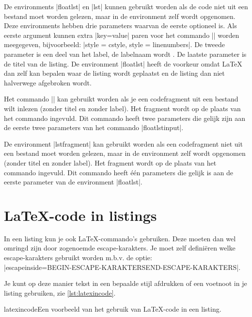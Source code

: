 De environments |floatlst| en |lst| kunnen gebruikt worden als de code niet uit een bestand moet worden gelezen, maar in de environment zelf wordt opgenomen.
Deze environments hebben drie parameters waarvan de eerste optioneel is.
Als eerste argument kunnen extra |key=value| paren voor het commando |\lstset| worden meegegeven, bijvoorbeeld: |style = cstyle, style = linenumbers|.
De tweede parameter is een deel van het label, de labelnaam wordt {\lstllabel{}}.
De laatste parameter is de titel van de listing.
De environment |floatlst| heeft de voorkeur omdat \LaTeX{} dan zelf kan bepalen waar de listing wordt geplaatst en de listing dan niet halverwege afgebroken wordt.

Het commando |\lstinputfragment| kan gebruikt worden als je een codefragment uit een bestand wilt inlezen (zonder titel en zonder label).
Het fragment wordt op de plaats van het commando ingevuld.
Dit commando heeft twee parameters die gelijk zijn aan de eerste twee parameters van het commando |floatlstinput|.

De environment |lstfragment| kan gebruikt worden als een codefragment niet uit een bestand moet worden gelezen, maar in de environment zelf wordt opgenomen (zonder titel en zonder label).
Het fragment wordt op de plaats van het commando ingevuld.
Dit commando heeft één parameters die gelijk is aan de eerste parameter van de environment |floatlst|.

\section{\LaTeX-code in listings}
In een listing kun je ook \LaTeX-commando's gebruiken. Deze moeten dan wel omringd zijn door zogenoemde escape-karakters. Je moet zelf definiëren welke escape-karakters gebruikt worden m.b.v. de optie:\\ |escapeinside={BEGIN-ESCAPE-KARAKTERS}{END-ESCAPE-KARAKTERS}|.

Je kunt op deze manier tekst in een bepaalde stijl afdrukken of een voetnoot in je listing gebruiken, zie \cref{lst:latexincode}. 
\begin{lst}[style=lstyle]{latexincode}{Een voorbeeld van het gebruik van \LaTeX-code in een listing.}
\begin{lstfragment}[style=cstyle,escapeinside={(*}{*)}]{
	// Dit is een (*\textcolor{hrred}{belangrijk}*) voorbeeld.
	int main() {
		return 0(*\footnotemark*);
	}
\end{lstfragment}
\end{lst}

